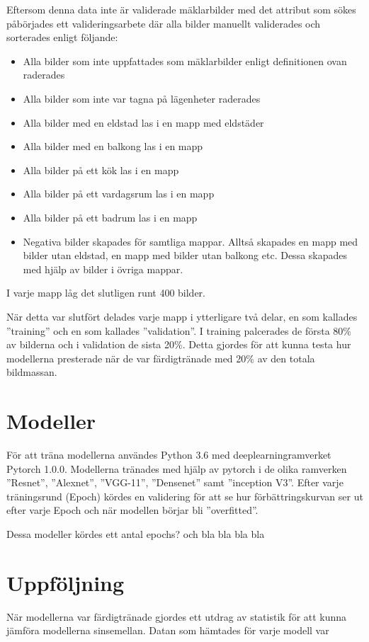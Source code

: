 \documentclass[]{kththesis}
\begin{document}
Eftersom denna data inte är validerade mäklarbilder med det attribut som sökes påbörjades ett valideringsarbete där alla bilder manuellt validerades och sorterades enligt följande:
\begin{itemize}
  \item Alla bilder som inte uppfattades som mäklarbilder enligt definitionen ovan raderades
  \item Alla bilder som inte var tagna på lägenheter raderades
  \item Alla bilder med en eldstad las i en mapp med eldstäder
  \item Alla bilder med en balkong las i en mapp
  \item Alla bilder på ett kök las i en mapp
  \item Alla bilder på ett vardagsrum las i en mapp
  \item Alla bilder på ett badrum las i en mapp
  \item Negativa bilder skapades för samtliga mappar. Alltså skapades en mapp med bilder utan eldstad, en mapp med bilder utan balkong etc. Dessa skapades med hjälp av bilder i övriga mappar. 
\end{itemize} 

I varje mapp låg det slutligen runt 400 bilder. 

När detta var slutfört delades varje mapp i ytterligare två delar, en som kallades ”training” och en som kallades ”validation”.
I training palcerades de första 80\% av bilderna och i validation de sista 20\%.
Detta gjordes för att kunna testa hur modellerna presterade när de var färdigtränade med 20\% av den totala bildmassan.


\section{Modeller}
För att träna modellerna användes Python 3.6 med deeplearningramverket Pytorch 1.0.0. 
Modellerna tränades med  hjälp av pytorch i de olika ramverken ”Resnet”, ”Alexnet”, ”VGG-11”, ”Densenet” samt ”inception V3”.
Efter varje träningsrund (Epoch) kördes en validering för att se hur förbättringskurvan ser ut efter varje Epoch och när modellen börjar bli ”overfitted”.

Dessa modeller kördes ett antal epochs? och bla bla bla bla

\section{Uppföljning}
När modellerna var färdigtränade gjordes ett utdrag av statistik för att kunna jämföra modellerna sinsemellan.
Datan som hämtades för varje modell var
\end{document}
